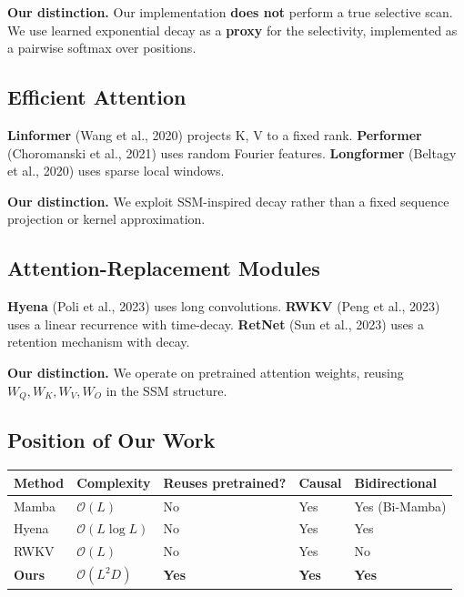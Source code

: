 \textbf{Our distinction.} Our implementation \textbf{does not} perform a true selective 
scan. We use learned exponential decay as a \textbf{proxy} for the selectivity, 
implemented as a pairwise softmax over positions.

\subsection{Efficient Attention}

\textbf{Linformer} (Wang et al., 2020) projects K, V to a fixed rank. 
\textbf{Performer} (Choromanski et al., 2021) uses random Fourier features. 
\textbf{Longformer} (Beltagy et al., 2020) uses sparse local windows.

\textbf{Our distinction.} We exploit SSM-inspired decay rather than a fixed 
sequence projection or kernel approximation.

\subsection{Attention-Replacement Modules}

\textbf{Hyena} (Poli et al., 2023) uses long convolutions. \textbf{RWKV} (Peng et al., 
2023) uses a linear recurrence with time-decay. \textbf{RetNet} (Sun et al., 2023) 
uses a retention mechanism with decay.

\textbf{Our distinction.} We operate on pretrained attention weights, reusing 
$W_Q, W_K, W_V, W_O$ in the SSM structure.

\subsection{Position of Our Work}

\begin{table}[H]
\centering
\small
\begin{tabular}{lllll}
\toprule
\textbf{Method} & \textbf{Complexity} & \textbf{Reuses pretrained?} & \textbf{Causal} & \textbf{Bidirectional} \\
\midrule
Mamba & $\mathcal{O}(L)$ & No & Yes & Yes (Bi-Mamba) \\
Hyena & $\mathcal{O}(L \log L)$ & No & Yes & Yes \\
RWKV & $\mathcal{O}(L)$ & No & Yes & No \\
\textbf{Ours} & \textbf{$\mathcal{O}(L^2 D)$} & \textbf{Yes} & \textbf{Yes} & \textbf{Yes} \\
\bottomrule
\end{tabular}
\end{table}

